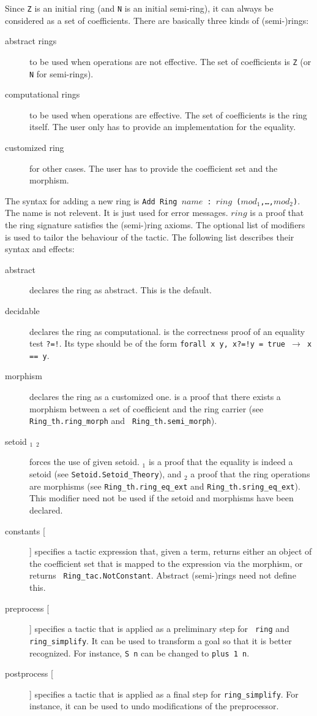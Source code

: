 Since {\tt Z} is an initial ring (and {\tt N} is an initial
semi-ring), it can always be considered as a set of
coefficients. There are basically three kinds of (semi-)rings:
\begin{description}
\item[abstract rings] to be used when operations are not
  effective. The set of coefficients is {\tt Z} (or {\tt N} for
  semi-rings).
\item[computational rings] to be used when operations are
  effective. The set of coefficients is the ring itself. The user only
  has to provide an implementation for the equality.
\item[customized ring] for other cases. The user has to provide the
  coefficient set and the morphism.
\end{description}

The syntax for adding a new ring is {\tt Add Ring $name$ : $ring$
($mod_1$,\dots,$mod_2$)}.  The name is not relevent. It is just used
for error messages. $ring$ is a proof that the ring signature
satisfies the (semi-)ring axioms. The optional list of modifiers is
used to tailor the behaviour of the tactic. The following list
describes their syntax and effects:
\begin{description}
\item[abstract] declares the ring as abstract. This is the default.
\item[decidable \term] declares the ring as computational. \term{} is
  the correctness proof of an equality test {\tt ?=!}. Its type should be of
  the form {\tt forall x y, x?=!y = true $\rightarrow$ x == y}.
\item[morphism \term] declares the ring as a customized one. \term{} is
  a proof that there exists a morphism between a set of coefficient
  and the ring carrier (see {\tt Ring\_th.ring\_morph} and {\tt
  Ring\_th.semi\_morph}).
\item[setoid \term$_1$ \term$_2$] forces the use of given
  setoid. \term$_1$ is a proof that the equality is indeed a setoid
  (see {\tt Setoid.Setoid\_Theory}), and \term$_2$ a proof that the
  ring operations are morphisms (see {\tt Ring\_th.ring\_eq\_ext} and
  {\tt Ring\_th.sring\_eq\_ext}). This modifier need not be used if the
  setoid and morphisms have been declared.
\item[constants [\ltac]] specifies a tactic expression that, given a term,
  returns either an object of the coefficient set that is mapped to
  the expression via the morphism, or returns {\tt
  Ring\_tac.NotConstant}. Abstract (semi-)rings need not define this.
\item[preprocess [\ltac]]
  specifies a tactic that is applied as a preliminary step for {\tt
  ring} and {\tt ring\_simplify}. It can be used to transform a goal
  so that it is better recognized. For instance, {\tt S n} can be
  changed to {\tt plus 1 n}.
\item[postprocess [\ltac]] specifies a tactic that is applied as a final step
  for {\tt ring\_simplify}. For instance, it can be used to undo
  modifications of the preprocessor.
\end{description}


